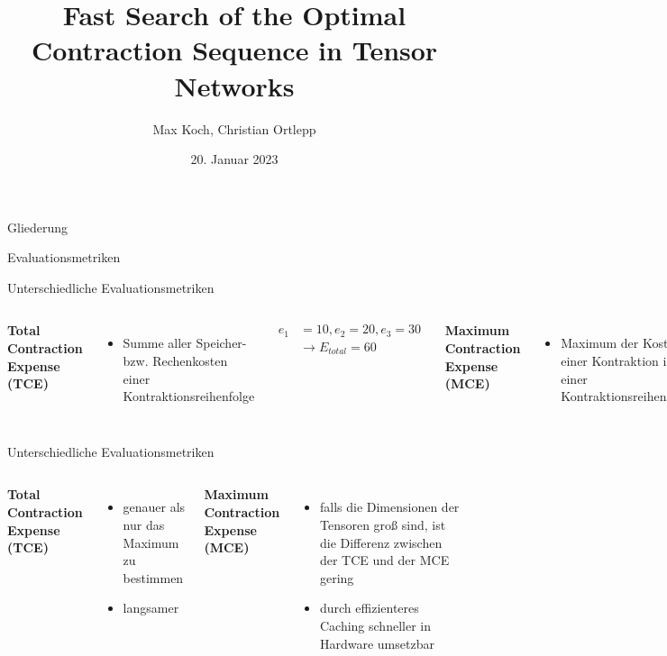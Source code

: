 \documentclass{beamer}
\title{Fast Search of the Optimal Contraction Sequence in Tensor Networks\cite{9325533}}
\author{Max Koch, Christian Ortlepp}
\institute{Friedrich-Schiller-Universität Jena}
\date{20. Januar 2023}
\begin{document}
	
	\maketitle 
	\begin{frame}{Gliederung}
		\tableofcontents
	\end{frame}
	
	\begin{section}{Evaluationsmetriken}
		\begin{frame}{Unterschiedliche Evaluationsmetriken}
			\begin{columns}[]

					\textbf{Total Contraction Expense (TCE)}
					\begin{itemize}
						\item Summe aller Speicher- bzw. Rechenkosten einer Kontraktionsreihenfolge
					\end{itemize}
					\begin{align*}
						e_1 &= 10, e_2 = 20, e_3 = 30 \\
						&\rightarrow E_{total} = 60
					\end{align*}


					\textbf{Maximum Contraction Expense (MCE)}
					\begin{itemize}
						\item Maximum der Kosten einer Kontraktion in einer Kontraktionsreihenfolge
					\end{itemize}
					\begin{align*}
						e_1 &= 10, e_2 = 20, e_3 = 30 \\
						&\rightarrow E_{max} = 30
					\end{align*}
			\end{columns}
		\end{frame}

		\begin{frame}{Unterschiedliche Evaluationsmetriken}
			\begin{columns}	
						\textbf{Total Contraction Expense (TCE)}
						\begin{itemize}
							\item genauer als nur das Maximum zu bestimmen
							\item langsamer
						\end{itemize}


					\textbf{Maximum Contraction Expense (MCE)}
					\begin{itemize}
						\item falls die Dimensionen der Tensoren groß sind, ist die Differenz zwischen der TCE und der MCE gering
						\item durch effizienteres Caching schneller in Hardware umsetzbar
					\end{itemize}


\end{columns}
\end{frame}
\end{section}
\end{document}
